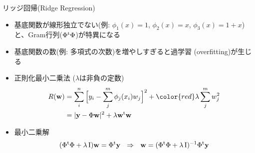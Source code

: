 \begin{frame}[t,fragile]{リッジ回帰(Ridge Regression)}
  \begin{itemize}
  \item 基底関数が線形独立でない(例: $\phi_1(x)=1$, $\phi_2(x)=x$, $\phi_3(x)=1+x$)と、Gram行列($\Phi^{\rm t} \Phi$)が特異になる
  \item 基底関数の数(例: 多項式の次数)を増やしすぎると過学習 (overfitting)が生じる
  \item 正則化最小二乗法 ($\lambda$は非負の定数)
    \begin{align*}
    R({\bf w}) &= \sum_i^n \Big[y_i - \sum_j^m \phi_j(x_i) w_j\Big]^2 + {\color{red} \lambda} \sum_j^m w_j^2 \\
    &= | {\bf y} - \Phi {\bf w} |^2 + \lambda {\bf w}^{\rm t} {\bf w}
    \end{align*}
  \item 最小二乗解
    \[
    (\Phi^{\rm t} \Phi + \lambda \, {\rm I}) {\bf w} = \Phi^{\rm t} {\bf y} \ \ \Rightarrow \ \ 
      {\bf w} = (\Phi^{\rm t} \Phi + \lambda \, {\rm I})^{-1}\Phi^{\rm t} {\bf y}
      \]
  \end{itemize}
\end{frame}

